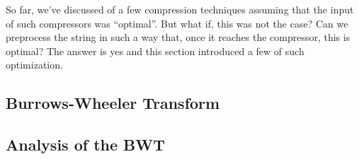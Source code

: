 \documentclass{subfiles}
\begin{document}
    So far, we've discussed of a few compression techniques 
        assuming that the input of such compressors was ``optimal''\footnotemark[2].
        But what if, this was not the case? 
        Can we preprocess the string in such a way that,
            once it reaches the compressor, this is optimal?
        The answer is yes and this section introduced a few of such optimization.


    \subsection{Burrows-Wheeler Transform}
    

    \subsection{Analysis of the BWT}
    
\end{document}
